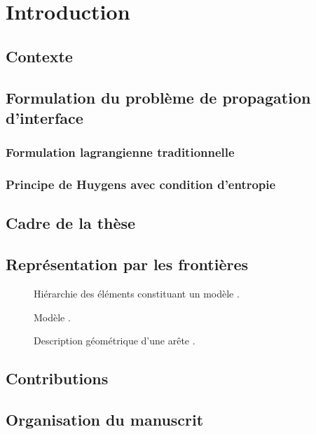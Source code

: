 \chapter{Introduction}

\section{Contexte}


\section{Formulation du problème de propagation d'interface}

\subsection{Formulation lagrangienne traditionnelle}

\subsection{Principe de Huygens avec condition d'entropie}


\section{Cadre de la thèse}


\section{Représentation par les frontières}




\begin{figure}
	\centering
	
	\caption{Hiérarchie des éléments constituant un modèle \brep.}
	\label{fig:BRep_hierarchy}
\end{figure}

\begin{figure}
	\centering
	
	\caption{Modèle \brep.}
	\label{fig:BRep}
\end{figure}

\begin{figure}
	\centering
	
	\caption{Description géométrique d'une arête \brep.}
\end{figure}




\section{Contributions}


\section{Organisation du manuscrit}